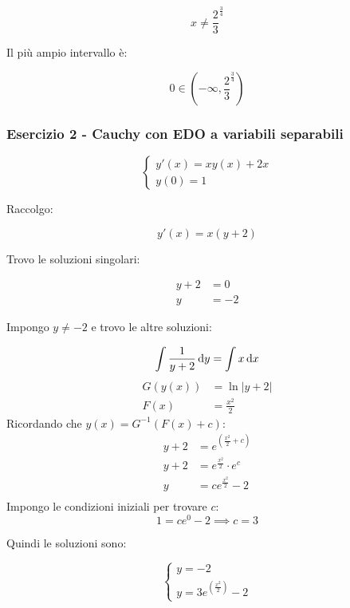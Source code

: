 \[
    x \neq \frac{2}{3}^{ \frac{3}{4}}
\]

Il più ampio intervallo è:

\[
    0 \in \left(-\infty, \frac{2}{3}^{ \frac{3}{4}}\right)
\]

\pagebreak
\subsubsection*{Esercizio 2 {-} Cauchy con EDO a variabili separabili}

\begin{equation*}
    \begin{cases}
        y'(x) = xy(x)+2x \\
        y(0) = 1
    \end{cases}
\end{equation*}

Raccolgo:

\[
    y'(x)=x(y+2)
\]

Trovo le soluzioni singolari:

\begin{align*}
    y+2 & =0  \\
    y   & =-2
\end{align*}

Impongo \(y \ne -2\) e trovo le altre soluzioni:

\[
    \int \frac{1}{y+2} \mathop{}\!\mathrm{d} y = \int x \mathop{}\!\mathrm{d} x
\]
\begin{align*}
    G(y(x)) & = \ln |y+2|     \\
    F(x)    & = \frac{x^2}{2}
\end{align*}
Ricordando che \(y(x) = G^{-1}(F(x) + c)\):
\begin{align*}
    y + 2 & = e^{\left( \frac{x^2}{2} + c \right)} \\
    y + 2 & = e^{\frac{x^{2}}{2}} \cdot e^c        \\
    y     & = ce^{\frac{x^{2}}{2}} - 2             \\
\end{align*}
Impongo le condizioni iniziali per trovare \(c\):
\[
    1 = c e^0 - 2 \implies c = 3
\]

Quindi le soluzioni sono:

\begin{equation*}
    \begin{cases}
        y = -2 \\
        y = 3e^{\left( \frac{x^{2}}{2} \right)} - 2
    \end{cases}
\end{equation*}
